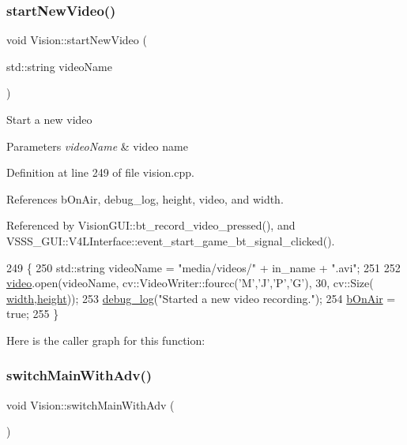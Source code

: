 \subsubsection{\texorpdfstring{start\+New\+Video()}{startNewVideo()}}
{\footnotesize\ttfamily void Vision\+::start\+New\+Video (\begin{DoxyParamCaption}\item[{std\+::string}]{video\+Name }\end{DoxyParamCaption})}

Start a new video 
\begin{DoxyParams}{Parameters}
{\em video\+Name} & video name \\
\hline
\end{DoxyParams}


Definition at line 249 of file vision.\+cpp.



References b\+On\+Air, debug\+\_\+log, height, video, and width.



Referenced by Vision\+G\+U\+I\+::bt\+\_\+record\+\_\+video\+\_\+pressed(), and V\+S\+S\+S\+\_\+\+G\+U\+I\+::\+V4\+L\+Interface\+::event\+\_\+start\+\_\+game\+\_\+bt\+\_\+signal\+\_\+clicked().


\begin{DoxyCode}
249                                             \{
250     std::string videoName = \textcolor{stringliteral}{"media/videos/"} + in\_name + \textcolor{stringliteral}{".avi"};
251 
252     \hyperlink{class_vision_a65230f76c9af171a0a9faba81b57f3d5}{video}.open(videoName, cv::VideoWriter::fourcc(\textcolor{charliteral}{'M'},\textcolor{charliteral}{'J'},\textcolor{charliteral}{'P'},\textcolor{charliteral}{'G'}), 30, cv::Size(
      \hyperlink{class_vision_ac82a1da77a8b08d112e5c4688bd70c3d}{width},\hyperlink{class_vision_aa6f52191ab439505b6156835594f1861}{height}));
253     \hyperlink{debug_8hpp_afde3f42696113719c9ae35507125ee6e}{debug\_log}(\textcolor{stringliteral}{"Started a new video recording."});
254     \hyperlink{class_vision_a1eb56f5e3433ca3dce53fe315b845979}{bOnAir} = \textcolor{keyword}{true};
255 \}
\end{DoxyCode}
Here is the caller graph for this function\+:
\mbox{\label{class_vision_a11fa5150abbd3b37e78999b46b7b3a84}} 
\subsubsection{\texorpdfstring{switch\+Main\+With\+Adv()}{switchMainWithAdv()}}
{\footnotesize\ttfamily void Vision\+::switch\+Main\+With\+Adv (\begin{DoxyParamCaption}{ }\end{DoxyParamCaption})}

